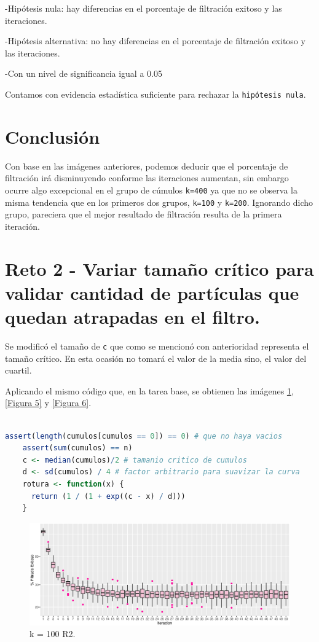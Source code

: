 \documentclass{article}
\begin{document}
-Hip\'otesis nula: hay diferencias en el porcentaje de filtraci\'on exitoso y las iteraciones.

-Hip\'otesis alternativa: no hay diferencias en el porcentaje de filtraci\'on exitoso y las iteraciones.

-Con un nivel de significancia igual a 0.05

Contamos con evidencia estad\'istica suficiente para rechazar la \texttt{hip\'otesis nula}.

\section{Conclusi\'on}
Con base en las im\'agenes anteriores, podemos deducir que el porcentaje de filtraci\'on ir\'a disminuyendo conforme las iteraciones aumentan, sin embargo ocurre algo excepcional en el grupo de c\'umulos \texttt{k=400} ya que no se observa la misma tendencia que en los primeros dos grupos, \texttt{k=100} y \texttt{k=200}.
Ignorando dicho grupo, pareciera que el mejor resultado de filtraci\'on resulta de la primera iteraci\'on.



\bigskip 


\section{Reto 2 - Variar tamaño cr\'itico para validar cantidad de part\'iculas que quedan atrapadas en el filtro.}

Se modific\'o el tamaño de \texttt{c} que como se mencion\'o con anterioridad representa el tamaño cr\'itico. En esta ocasi\'on no tomar\'a el valor de la media sino, el valor del cuartil.

Aplicando el mismo c\'odigo que, en la tarea base, se obtienen las im\'agenes \ref{Figura 4}, \ref{Figura 5} y \ref{Figura 6}.

\begin{lstlisting}[language=R, caption= Segmento de c\'odigo para modificar valor del tamaño cr\'itico.]

assert(length(cumulos[cumulos == 0]) == 0) # que no haya vacios
    assert(sum(cumulos) == n)
    c <- median(cumulos)/2 # tamanio critico de cumulos
    d <- sd(cumulos) / 4 # factor arbitrario para suavizar la curva
    rotura <- function(x) {
      return (1 / (1 + exp((c - x) / d)))
    }
\end{lstlisting}
\newpage
\begin{figure}[ht] %
    \centering
    \includegraphics[width=150mm]{k100r2.eps} %
    \caption{k = 100 R2.}
    \label{Figura 4}
\end{figure}
\end{document}
